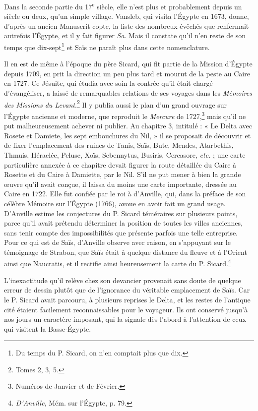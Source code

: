 \documentclass[letterpaper,twocolumn,openany,nodeprecatedcode]{dndbook}
\begin{document}
Dans la seconde partie du 17\textsuperscript{e} siècle, elle n'est plus et probablement depuis un siècle ou deux, qu'un simple village. Vansleb, qui visita l'Égypte en 1673, donne, d'après un ancien Manuscrit copte, la liste des nombreux évêchés que renfermait autrefois l'Égypte, et il y fait figurer \emph{Sa}. Mais il constate qu'il n'en reste de son temps que dix-sept\footnote{Du temps du P. Sicard, on n'en comptait plus que dix.} et Saïs ne paraît plus dans cette nomenclature.

Il en est de même à l'époque du père Sicard, qui fit partie de la Mission d'Égypte depuis 1709, en prit la direction un peu plus tard et mourut de la peste au Caire en 1727. Ce Jésuite, qui étudia avec soin la contrée qu'il était chargé d'évangéliser, a laissé de remarquables relations de ses voyages dans les \emph{Mémoires des Missions du Levant}.\footnote{Tomes 2, 3, 5.} Il y publia aussi le plan d'un grand ouvrage sur l'Égypte ancienne et moderne, que reproduit le \emph{Mercure} de 1727,\footnote{Numéros de Janvier et de Février.} mais qu'il ne put malheureusement achever ni publier. Au chapitre 3, intitulé : « Le Delta avec Rosete et Damiete, les sept embouchures du Nil, » il se proposait de découvrir et de fixer l'emplacement des ruines de Tanis, Saïs, Bute, Mendes, Atarbethis, Thmuis, Héraclée, Peluse, Xoïs, Sebennytus, Busiris, Cercasore, \emph{etc.} ; une carte particulière annexée à ce chapitre devait figurer la route détaillée du Caire à Rosette et du Caire à Damiette, par le Nil. S'il ne put mener à bien la grande œuvre qu'il avait conçue, il laissa du moins une carte importante, dressée au Caire en 1722. Elle fut confiée par le roi à d'Anville, qui, dans la préface de son célèbre Mémoire sur l'Égypte (1766), avoue en avoir fait un grand usage. D'Anville estime les conjectures du P. Sicard téméraires sur plusieurs points, parce qu’il avait prétendu déterminer la position de toutes les villes anciennes, sans tenir compte des impossibilités que présente parfois une telle entreprise. Pour ce qui est de Saïs, d'Anville observe avec raison, en s'appuyant sur le témoignage de Strabon, que Saïs était à quelque distance du fleuve et à l'Orient ainsi que Naucratis, et il rectifie ainsi heureusement la carte du P. Sicard.\footnote{\emph{D'Anville}, Mém. sur l'Égypte, p. 79.}

L'inexactitude qu'il relève chez son devancier provenait sans doute de quelque erreur de dessin plutôt que de l'ignorance du véritable emplacement de Saïs. Car le P. Sicard avait parcouru, à plusieurs reprises le Delta, et les restes de l'antique cité étaient facilement reconnaissables pour le voyageur. Ils ont conservé jusqu'à nos jours un caractère imposant, qui la signale dès l'abord à l'attention de ceux qui visitent la Basse-Égypte.
\end{document}
